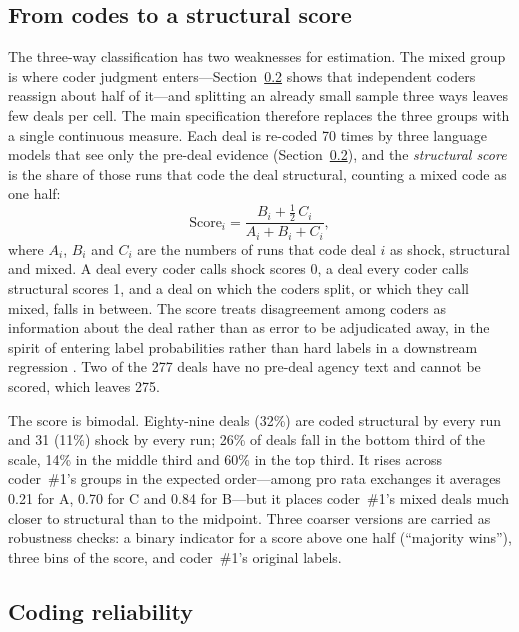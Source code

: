 \documentclass[12pt]{article}
\begin{document}
\subsection{From codes to a structural score}
\label{sec:score}

The three-way classification has two weaknesses for estimation. The mixed group is where coder judgment enters---Section~\ref{sec:reliability} shows that independent coders reassign about half of it---and splitting an already small sample three ways leaves few deals per cell. The main specification therefore replaces the three groups with a single continuous measure. Each deal is re-coded 70 times by three language models that see only the pre-deal evidence (Section~\ref{sec:reliability}), and the \emph{structural score} is the share of those runs that code the deal structural, counting a mixed code as one half:
\begin{equation}
  \text{Score}_i = \frac{B_i + \tfrac{1}{2}\,C_i}{A_i + B_i + C_i},
  \label{eq:score}
\end{equation}
where $A_i$, $B_i$ and $C_i$ are the numbers of runs that code deal $i$ as shock, structural and mixed. A deal every coder calls shock scores 0, a deal every coder calls structural scores 1, and a deal on which the coders split, or which they call mixed, falls in between. The score treats disagreement among coders as information about the deal rather than as error to be adjudicated away, in the spirit of entering label probabilities rather than hard labels in a downstream regression \citep{egami2023}. Two of the 277 deals have no pre-deal agency text and cannot be scored, which leaves 275.

The score is bimodal. Eighty-nine deals (32\%) are coded structural by every run and 31 (11\%) shock by every run; 26\% of deals fall in the bottom third of the scale, 14\% in the middle third and 60\% in the top third. It rises across coder~\#1's groups in the expected order---among pro rata exchanges it averages 0.21 for A, 0.70 for C and 0.84 for B---but it places coder~\#1's mixed deals much closer to structural than to the midpoint. Three coarser versions are carried as robustness checks: a binary indicator for a score above one half (``majority wins''), three bins of the score, and coder~\#1's original labels.

\subsection{Coding reliability}
\label{sec:reliability}
\end{document}
